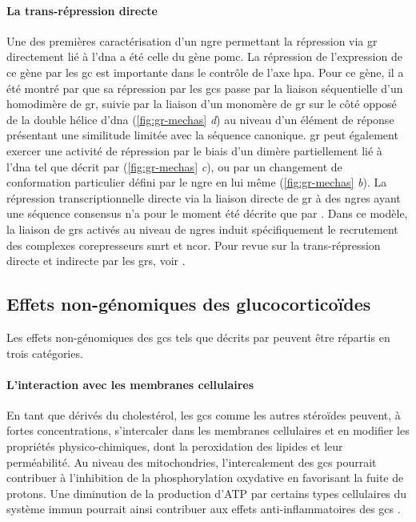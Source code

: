 \documentclass[../main.tex]{subfiles}
\begin{document}
\paragraph{La trans-répression directe}
Une des premières caractérisation d'un \gls{ngre} permettant la répression via \gls{gr} directement lié à l'\gls{dna} a été celle du gène \gls{pomc}.
La répression de l'expression de ce gène par les \gls{gc} est importante dans le contrôle de l'axe \gls{hpa}.
Pour ce gène, il a été montré par \citet{Drouin1993} que sa répression par les \glspl{gc} passe par la liaison séquentielle d'un homodimère de \gls{gr}, suivie par la liaison d'un monomère de \gls{gr} sur le côté opposé de la double hélice d'\gls{dna} (\autoref{fig:gr-mechas} \textit{d}) au niveau d'un élément de réponse présentant une similitude limitée avec la séquence canonique.
\gls{gr} peut également exercer une activité de répression par le biais d'un dimère partiellement lié à l'\gls{dna} tel que décrit par \citet{Lefstin1998} (\autoref{fig:gr-mechas} \textit{c}), ou par un changement de conformation particulier défini par le \gls{ngre} en lui même (\autoref{fig:gr-mechas} \textit{b}).
La répression transcriptionnelle directe via la liaison directe de \gls{gr} à des \glspl{ngre} ayant une séquence consensus n'a pour le moment été décrite que par \citet{Surjit2011}.
Dans ce modèle, la liaison de \glspl{gr} activés au niveau de \glspl{ngre} induit spécifiquement le recrutement des complexes corepresseurs \gls{smrt} et \gls{ncor}.
Pour revue sur la trans-répression directe et indirecte par les \glspl{gr}, voir \citet{Dostert2004}.

\subsection{Effets non-génomiques des glucocorticoïdes}
Les effets non-génomiques des \glspl{gc} tels que décrits par \citet{Stahn2008a} peuvent être répartis en trois catégories.

\paragraph{L'interaction avec les membranes cellulaires}
En tant que dérivés du cholestérol, les \glspl{gc} comme les autres stéroïdes peuvent, à fortes concentrations, s'intercaler dans les membranes cellulaires et en modifier les propriétés physico-chimiques, dont la peroxidation des lipides et leur perméabilité.
Au niveau des mitochondries, l'intercalement des \glspl{gc} pourrait contribuer à l'inhibition de la phosphorylation oxydative en favorisant la fuite de protons.
Une diminution de la production d'ATP par certains types cellulaires du système immun pourrait ainsi contribuer aux effets anti-inflammatoires des \glspl{gc} \citep{Buttgereit2002}.
\end{document}
